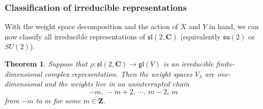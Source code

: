 \documentclass[12pt]{article}
\newcommand{\CC}{\mathbf{C}}
\newcommand{\ZZ}{\mathbf{Z}}
\newtheorem{thm}{Theorem}[section]
\theoremstyle{definition}
\theoremstyle{check}
\theoremstyle{remark}
\theoremstyle{TheoremNum}
\begin{document}
\subsubsection{Classification of irreducible representations}

With the weight space decomposition and the action of $X$ and $Y$ in hand, we can now classify all irreducible representations of $\mathfrak{sl}(2,\CC)$ (equivalently $\mathfrak{su}(2)$ or $SU(2)$).

\begin{thm}\label{thm-su2-classif}
Suppose that $\rho\colon\mathfrak{sl}(2,\CC)\to\mathfrak{gl}(V)$ is an {\em irreducible} finite-dimensional complex representation. Then the weight spaces $V_{\lambda}$ are one-dimensional and the weights live in an uninterrupted chain
\[-m,\ -m+2,\ \cdots,\ m-2,\ m\]
from $-m$ to $m$ for some $m\in\ZZ$.
\end{thm}
\end{document}
